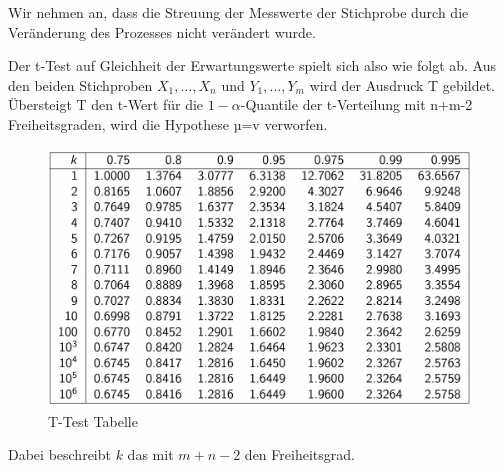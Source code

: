 \documentclass[../Main.tex]{subfiles}
\begin{document}

Wir nehmen an, dass die Streuung der Messwerte der Stichprobe durch die Veränderung des Prozesses
nicht verändert wurde.

Der t-Test auf Gleichheit der Erwartungswerte spielt sich also wie folgt ab. Aus den beiden
Stichproben \(X_1,\dots,X_n\) und \(Y_1,\dots,Y_m\) wird der Ausdruck T gebildet. Übersteigt T den
t-Wert für die \(1-\alpha\)-Quantile der t-Verteilung mit n+m-2 Freiheitsgraden, wird die Hypothese
µ=v verworfen.

\begin{figure}[H]
    \centering
    \includegraphics[width=1\linewidth]{Images/t-test-tabelle.png}
    \caption{T-Test Tabelle}
\end{figure}
Dabei beschreibt \(k\) das mit \(m+n-2\) den Freiheitsgrad.
\end{document}
